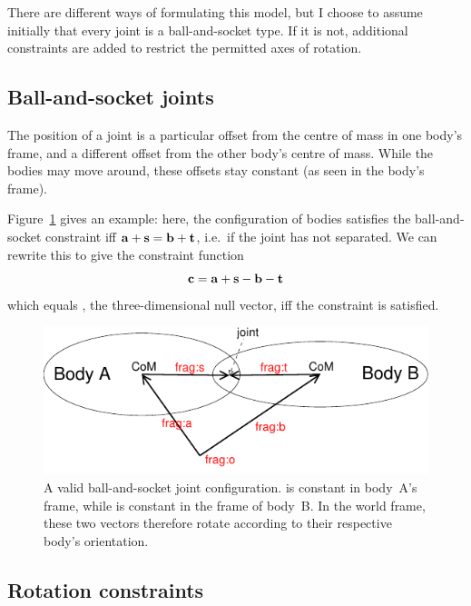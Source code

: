 There are different ways of formulating this model, but I choose to assume initially that every
joint is a ball-and-socket type. If it is not, additional constraints are added to restrict
the permitted axes of rotation.

\subsection{Ball-and-socket joints}

The position of a joint is a particular offset from the centre of mass in one body's frame, and a
different offset from the other body's centre of mass. While the bodies may move around, these
offsets stay constant (as seen in the body's frame).

Figure~\ref{ballAndSocketFigure} gives an example: here, the configuration of bodies satisfies the
ball-and-socket constraint iff $\ve{a}+\ve{s} = \ve{b}+\ve{t}$, i.e.\ if the joint has not
separated. We can rewrite this to give the constraint function
\begin{equation}
\ve{c} = \ve{a} + \ve{s} - \ve{b} - \ve{t}
\end{equation}
which equals , the three-dimensional null vector, iff the constraint is satisfied.

\begin{figure}
\centerline{\includegraphics{figures/joint2}}
\caption[]{A valid ball-and-socket joint configuration.  is constant in body~A's frame,
    while  is constant in the frame of body~B. In the world frame, these two vectors
    therefore rotate according to their respective body's orientation.\label{ballAndSocketFigure}}
\end{figure}

\subsection{Rotation constraints\label{rotationConstraints}}


